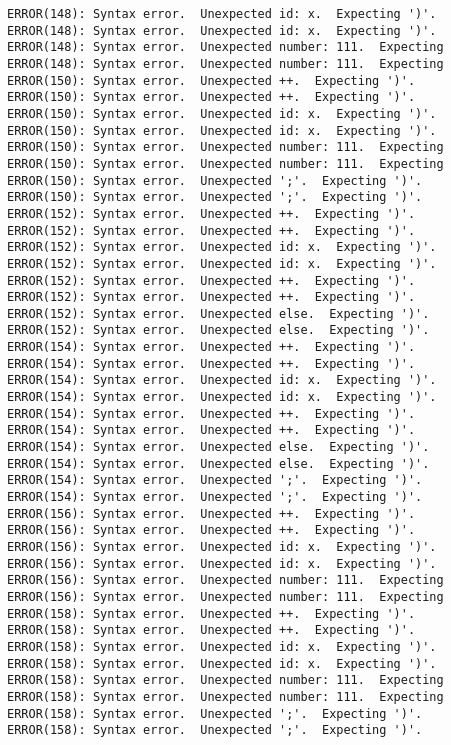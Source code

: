 \documentclass[12pt]{book}
\begin{document}
\begin{lstlisting}
ERROR(148): Syntax error.  Unexpected id: x.  Expecting ')'.	ERROR(148): Syntax error.  Unexpected id: x.  Expecting ')'.
ERROR(148): Syntax error.  Unexpected number: 111.  Expecting	ERROR(148): Syntax error.  Unexpected number: 111.  Expecting
ERROR(150): Syntax error.  Unexpected ++.  Expecting ')'.	ERROR(150): Syntax error.  Unexpected ++.  Expecting ')'.
ERROR(150): Syntax error.  Unexpected id: x.  Expecting ')'.	ERROR(150): Syntax error.  Unexpected id: x.  Expecting ')'.
ERROR(150): Syntax error.  Unexpected number: 111.  Expecting	ERROR(150): Syntax error.  Unexpected number: 111.  Expecting
ERROR(150): Syntax error.  Unexpected ';'.  Expecting ')'.	ERROR(150): Syntax error.  Unexpected ';'.  Expecting ')'.
ERROR(152): Syntax error.  Unexpected ++.  Expecting ')'.	ERROR(152): Syntax error.  Unexpected ++.  Expecting ')'.
ERROR(152): Syntax error.  Unexpected id: x.  Expecting ')'.	ERROR(152): Syntax error.  Unexpected id: x.  Expecting ')'.
ERROR(152): Syntax error.  Unexpected ++.  Expecting ')'.	ERROR(152): Syntax error.  Unexpected ++.  Expecting ')'.
ERROR(152): Syntax error.  Unexpected else.  Expecting ')'.	ERROR(152): Syntax error.  Unexpected else.  Expecting ')'.
ERROR(154): Syntax error.  Unexpected ++.  Expecting ')'.	ERROR(154): Syntax error.  Unexpected ++.  Expecting ')'.
ERROR(154): Syntax error.  Unexpected id: x.  Expecting ')'.	ERROR(154): Syntax error.  Unexpected id: x.  Expecting ')'.
ERROR(154): Syntax error.  Unexpected ++.  Expecting ')'.	ERROR(154): Syntax error.  Unexpected ++.  Expecting ')'.
ERROR(154): Syntax error.  Unexpected else.  Expecting ')'.	ERROR(154): Syntax error.  Unexpected else.  Expecting ')'.
ERROR(154): Syntax error.  Unexpected ';'.  Expecting ')'.	ERROR(154): Syntax error.  Unexpected ';'.  Expecting ')'.
ERROR(156): Syntax error.  Unexpected ++.  Expecting ')'.	ERROR(156): Syntax error.  Unexpected ++.  Expecting ')'.
ERROR(156): Syntax error.  Unexpected id: x.  Expecting ')'.	ERROR(156): Syntax error.  Unexpected id: x.  Expecting ')'.
ERROR(156): Syntax error.  Unexpected number: 111.  Expecting	ERROR(156): Syntax error.  Unexpected number: 111.  Expecting
ERROR(158): Syntax error.  Unexpected ++.  Expecting ')'.	ERROR(158): Syntax error.  Unexpected ++.  Expecting ')'.
ERROR(158): Syntax error.  Unexpected id: x.  Expecting ')'.	ERROR(158): Syntax error.  Unexpected id: x.  Expecting ')'.
ERROR(158): Syntax error.  Unexpected number: 111.  Expecting	ERROR(158): Syntax error.  Unexpected number: 111.  Expecting
ERROR(158): Syntax error.  Unexpected ';'.  Expecting ')'.	ERROR(158): Syntax error.  Unexpected ';'.  Expecting ')'.

\end{lstlisting}
\end{document}

